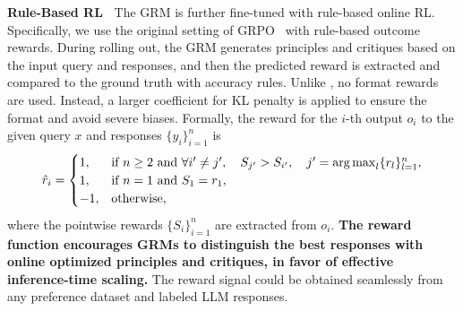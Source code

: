 \documentclass{article} %
\begin{document}
\noindent\textbf{Rule-Based RL\ } The GRM is further fine-tuned with rule-based online RL. Specifically, we use the original setting of GRPO~\citep{shao2024deepseekmathpushinglimitsmathematical} with rule-based outcome rewards. During rolling out, the GRM generates principles and critiques based on the input query and responses, and then the predicted reward is extracted and compared to the ground truth with accuracy rules. Unlike \citet{deepseekai2025deepseekr1incentivizingreasoningcapability}, no format rewards are used. Instead, a larger coefficient for KL penalty is applied to ensure the format and avoid severe biases. Formally, the reward for the $i$-th output $o_i$ to the given query $x$ and responses $\{y_i\}_{i=1}^n$ is
\begin{equation}
  \hat{r}_i = \begin{cases}
    1, & \text{if } n \geq 2 \text{ and } \forall i' \neq j', \quad S_{j'} > S_{i'}, \quad j' = \operatorname*{arg\,max}_{l} \{r_l\}_{l=1}^n, \\
    1, & \text{if } n = 1 \text{ and } S_1 = r_1, \\
    -1, & \text{otherwise},
  \end{cases}
\end{equation}
where the pointwise rewards $\{S_i\}_{i=1}^n$ are extracted from $o_i$. \textbf{The reward function encourages GRMs to distinguish the best responses with online optimized principles and critiques, in favor of effective inference-time scaling.} The reward signal could be obtained seamlessly from any preference dataset and labeled LLM responses. 
\end{document}
